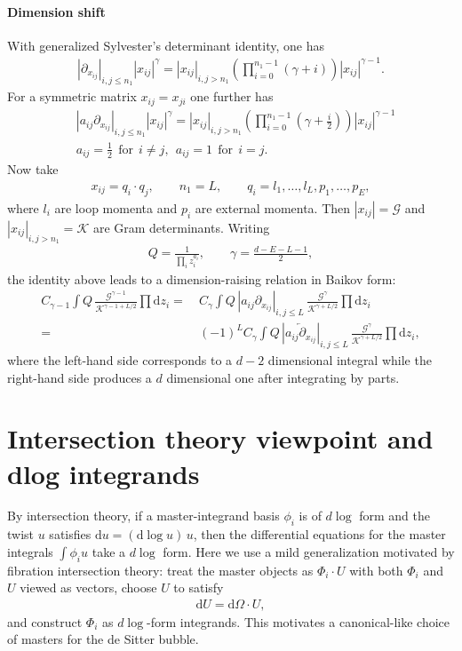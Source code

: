 \documentclass[a4paper,12pt]{article}
\newcommand{\n}{\nonumber}
\def\di{{\mathrm{d}}}
\newcommand{\mG}{\mathcal{G}}
\newcommand{\mK}{\mathcal{K}}
\begin{document}
\paragraph{Dimension shift}
With generalized Sylvester's determinant identity, one has
\begin{align}
	|\partial_{x_{ij}}|_{i,j\leq n_1} |x_{ij}|^\gamma
	= |x_{ij}|_{i,j> n_1}\left(\prod_{i=0}^{n_1-1} (\gamma+i)\right)|x_{ij}|^{\gamma-1}.
\end{align}
For a symmetric matrix $x_{ij}=x_{ji}$ one further has
\begin{align}
	&|a_{ij} \partial_{x_{ij}}|_{i,j\leq n_1} |x_{ij}|^\gamma = |x_{ij}|_{i,j> n_1}  \left(\prod_{i=0}^{n_1-1} \left(\gamma+\frac{i}{2}\right)\right)   |x_{ij}|^{\gamma-1}  \n\\
	&a_{ij}=\frac{1}{2} ~~\text{for}~~i\neq j,  ~~a_{ij}=1 ~~\text{for}~~i=j.
\end{align}
Now take
\begin{align}
	x_{ij}=q_i\cdotp q_j,\qquad n_1=L,\qquad q_i=l_1,\dots,l_L,p_1,\dots,p_E,
\end{align}
where $l_i$ are loop momenta and $p_i$ are external momenta. Then $|x_{ij}|=\mG$ and $|x_{ij}|_{i,j>n_1}=\mK$ are Gram determinants. Writing
\begin{align}
	Q=\frac{1}{\prod_i z_i^{a_i}},\qquad \gamma=\frac{d-E-L-1}{2},
\end{align}
the identity above leads to a dimension-raising relation in Baikov form:
\begin{align}
	C_{\gamma-1}\!\int Q\,\frac{\mG^{\gamma-1}}{\mK^{\gamma-1+L/2}}\prod \di z_i
	=&~C_{\gamma}\!\int Q\,|a_{ij} \partial_{x_{ij}}|_{i,j\leq L}\,
	\frac{\mG^\gamma}{\mK^{\gamma+L/2}}\prod \di z_i \n\\
	=&~(-1)^L C_{\gamma}\!\int Q\,|\overleftarrow{a_{ij} \partial_{x_{ij}}}|_{i,j\leq L}\,
	\frac{\mG^\gamma}{\mK^{\gamma+L/2}}\prod \di z_i,
\end{align}
where the left-hand side corresponds to a $d-2$ dimensional integral while the right-hand side produces a $d$ dimensional one after integrating by parts.

\section{Intersection theory viewpoint and dlog integrands}
\label{sec:dlog}
By intersection theory, if a master-integrand basis $\phi_i$ is of $d\log$ form and the twist $u$ satisfies $\di u=(\di\log u)\,u$, then the differential equations for the master integrals $\int \phi_i u$ take a $d\log$ form. Here we use a mild generalization motivated by fibration intersection theory: treat the master objects as $\Phi_i\cdot U$ with both $\Phi_i$ and $U$ viewed as vectors, choose $U$ to satisfy
\begin{align}
	\di U = \di\Omega \cdot U,
\end{align}
and construct $\Phi_i$ as $d\log$-form integrands. This motivates a canonical-like choice of masters for the de Sitter bubble.
\end{document}
